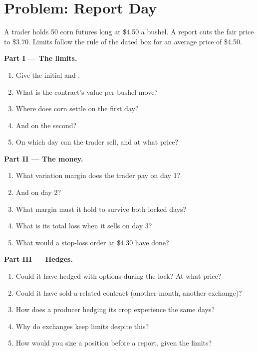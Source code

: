 \section{Problem: Report Day}

\begin{problem}\label{pb:m3:agriculturals-and-softs:1}
A trader holds 50 corn futures long at \$4.50 a bushel. A report cuts the fair price to \$3.70. Limits
follow the rule of the dated box for an average price of \$4.50.

\medskip\noindent\textbf{Part I --- The limits.}
\begin{enumerate}
\item Give the initial and .
\item What is the contract's value per bushel move?
\item Where does corn settle on the first day?
\item And on the second?
\item On which day can the trader sell, and at what price?
\end{enumerate}

\medskip\noindent\textbf{Part II --- The money.}
\begin{enumerate}[resume]
\item What variation margin does the trader pay on day 1?
\item And on day 2?
\item What margin must it hold to survive both locked days?
\item What is its total loss when it sells on day 3?
\item What would a stop-loss order at \$4.30 have done?
\end{enumerate}

\medskip\noindent\textbf{Part III --- Hedges.}
\begin{enumerate}[resume]
\item Could it have hedged with options during the lock? At what price?
\item Could it have sold a related contract (another month, another exchange)?
\item How does a producer hedging its crop experience the same days?
\item Why do exchanges keep limits despite this?
\item How would you size a position before a report, given the limits?
\end{enumerate}


\end{problem}

